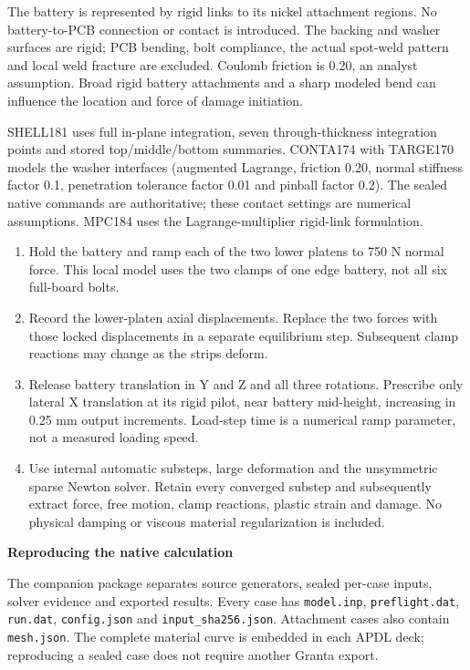 \documentclass[10pt,a4paper]{article}
\newcommand{\ReportHeading}[1]{\par\vspace{6pt}{\large\bfseries\color{Teal}#1}\par\vspace{3pt}}
\newcommand{\PageTitle}[1]{{\LARGE\bfseries\color{Navy}#1\par}\vspace{7pt}}
\begin{document}
The battery is represented by rigid links to its nickel attachment regions. No battery-to-PCB connection or contact is introduced. The backing and washer surfaces are rigid; PCB bending, bolt compliance, the actual spot-weld pattern and local weld fracture are excluded. Coulomb friction is 0.20, an analyst assumption. Broad rigid battery attachments and a sharp modeled bend can influence the location and force of damage initiation.

SHELL181 uses full in-plane integration, seven through-thickness integration points and stored top/middle/bottom summaries. CONTA174 with TARGE170 models the washer interfaces (augmented Lagrange, friction 0.20, normal stiffness factor 0.1, penetration tolerance factor 0.01 and pinball factor 0.2). The sealed native commands are authoritative; these contact settings are numerical assumptions. MPC184 uses the Lagrange-multiplier rigid-link formulation.

\begin{enumerate}
\item Hold the battery and ramp each of the two lower platens to 750 N normal force. This local model uses the two clamps of one edge battery, not all six full-board bolts.
\item Record the lower-platen axial displacements. Replace the two forces with those locked displacements in a separate equilibrium step. Subsequent clamp reactions may change as the strips deform.
\item Release battery translation in Y and Z and all three rotations. Prescribe only lateral X translation at its rigid pilot, near battery mid-height, increasing in 0.25 mm output increments. Load-step time is a numerical ramp parameter, not a measured loading speed.
\item Use internal automatic substeps, large deformation and the unsymmetric sparse Newton solver. Retain every converged substep and subsequently extract force, free motion, clamp reactions, plastic strain and damage. No physical damping or viscous material regularization is included.
\end{enumerate}

\clearpage
\PageTitle{Reproducing the native calculation}
\ReportHeading{Saved input is the authoritative definition}
The companion package separates source generators, sealed per-case inputs, solver evidence and exported results. Every case has \texttt{model.inp}, \texttt{preflight.dat}, \texttt{run.dat}, \texttt{config.json} and \texttt{input\_sha256.json}. Attachment cases also contain \texttt{mesh.json}. The complete material curve is embedded in each APDL deck; reproducing a sealed case does not require another Granta export.
\end{document}
